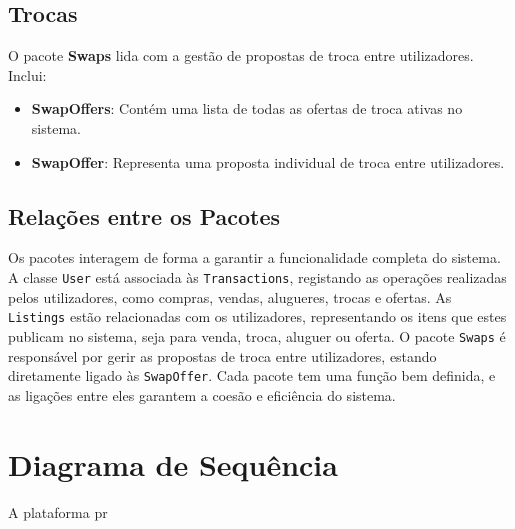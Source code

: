 \documentclass[a4paper, 12pt]{article} %
\begin{document}

\subsection{Trocas}

O pacote \textbf{Swaps} lida com a gestão de propostas de troca entre utilizadores. Inclui:

\begin{itemize} 
	\item \textbf{SwapOffers}: Contém uma lista de todas as ofertas de troca ativas no sistema. 
	\item \textbf{SwapOffer}: Representa uma proposta individual de troca entre utilizadores.
\end{itemize}


\subsection{Relações entre os Pacotes}

Os pacotes interagem de forma a garantir a funcionalidade completa do sistema. A classe \texttt{User} está associada às \texttt{Transactions}, registando as operações realizadas pelos utilizadores, como compras, vendas, alugueres, trocas e ofertas. As \texttt{Listings} estão relacionadas com os utilizadores, representando os itens que estes publicam no sistema, seja para venda, troca, aluguer ou oferta. O pacote \texttt{Swaps} é responsável por gerir as propostas de troca entre utilizadores, estando diretamente ligado às \texttt{SwapOffer}. Cada pacote tem uma função bem definida, e as ligações entre eles garantem a coesão e eficiência do sistema.
\newpage
\section*{Diagrama de Sequência}

A plataforma pr

\newpage
\end{document}
